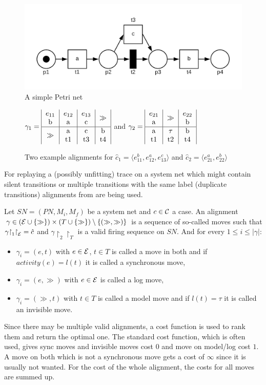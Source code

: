 \begin{figure}
    \centering
    \includegraphics[width=.6\textwidth]{figures/preliminaries/simplenet.png}
    \caption{A simple Petri net}
    \label{fig:simplenet}
\end{figure}

\begin{figure}
    \centering
    $\gamma_1=\bigalignment{4}{$e_{11}$ & $e_{12}$ & $e_{13}$ & \doublegg}{b & a & c & }{\doublegg & a & c & b}{ & t1 & t3 & t4}$ and $\gamma_2=\bigalignment{3}{$e_{21}$ & \doublegg & $e_{22}$}{a & & b}{a & $\tau$ & b}{t1 & t2 & t4}$
    \caption{Two example alignments for $\hat{c}_1 = \langle e_{11}^b, e_{12}^a, e_{13}^c \rangle$ and $\hat{c}_2 = \langle e_{21}^a, e_{22}^b \rangle$}
    \label{fig:simplealign}
\end{figure}
For replaying a (possibly unfitting) trace on a system net which might contain silent transitions or multiple transitions with the same label (duplicate transitions) alignments from \cite{van2012replaying} are being used.
\begin{definition}[Alignment]
Let $SN=(PN, M_i, M_f)$ be a system net and $c\in \mathcal{C}$ a case. An alignment $\gamma \in (\mathcal{E} \cup \{\gg\}) \times(T \cup \{ \gg \}) \setminus \{(\gg,\gg)\}$ is a sequence of so-called moves such that $\gamma\mathord{\upharpoonright}_1\mathord{\upharpoonright}_{\mathcal{E}} = \hat c$ and $\gamma\restriction_2\restriction_T$ is a valid firing sequence on $SN$. And for every $1\le i \le |\gamma|$:
\begin{itemize}
    \item $\gamma_i = (e,t)$ with $e\in \mathcal{E}$, $t\in T$ is called a move in both and if $activity(e) = l(t)$ it is called a synchronous move,
    \item $\gamma_i = (e,\gg)$ with $e\in \mathcal{E}$ is called a log move,
    \item $\gamma_i = (\gg, t)$ with $t\in T$ is called a model move and if $l(t) = \tau$ it is called an invisible move.
\end{itemize}
Since there may be multiple valid alignments, a cost function is used to rank them and return the optimal one. The standard cost function, which is often used, gives sync moves and invisible moves cost $0$ and move on model/log cost $1$. A move on both which is not a synchronous move gets a cost of $\infty$ since it is usually not wanted. For the cost of the whole alignment, the costs for all moves are summed up.
\end{definition}
